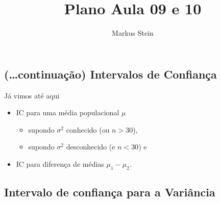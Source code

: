 \documentclass[
]{article}
\title{Plano Aula 09 e 10}
\author{Markus Stein}
\date{}
\providecommand{\tightlist}{%
  \setlength{\itemsep}{0pt}\setlength{\parskip}{0pt}}
\begin{document}
\maketitle

\addtolength{\headheight}{1.0cm} 
\pagestyle{fancyplain} 
\renewcommand{\headrulewidth}{0pt}

\hypertarget{continuauxe7uxe3o-intervalos-de-confianuxe7a}{%
\subsection{(\ldots continuação) Intervalos de
Confiança}\label{continuauxe7uxe3o-intervalos-de-confianuxe7a}}

Já vimos até aqui

\begin{itemize}
\tightlist
\item
  IC para uma média populacional \(\mu\)

  \begin{itemize}
  \tightlist
  \item
    supondo \(\sigma^2\) conhecido (ou \(n>30\)),
  \item
    supondo \(\sigma^2\) desconhecido (e \(n<30\)) e\\
  \end{itemize}
\item
  IC para diferença de médias \(\mu_1 - \mu_2\).
\end{itemize}

\vspace{0.5cm}

\hypertarget{intervalo-de-confianuxe7a-para-a-variuxe2ncia}{%
\subsection{Intervalo de confiança para a
Variância}\label{intervalo-de-confianuxe7a-para-a-variuxe2ncia}}
\end{document}
